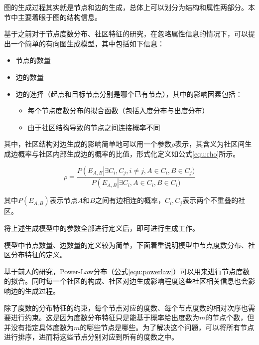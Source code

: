 图的生成过程其实就是节点和边的生成，总体上可以划分为结构和属性两部分。本节中主要着眼于图的结构信息。

基于之前对于节点度数分布、社区特征的研究，在忽略属性信息的情况下，可以提出一个简单的有向图生成模型，其中包括如下信息\cite{FastSGG}：

\begin{itemize}
    \item 节点的数量
    \item 边的数量
    \item 边的选择（起点和目标节点分别是哪个已有节点），其中的影响因素包括：
    \begin{itemize}
        \item 每个节点度数分布的拟合函数（包括入度分布与出度分布）
        \item 由于社区结构导致的节点之间连接概率不同
    \end{itemize}
\end{itemize}

\vspace{0.2cm}

其中，社区结构对边生成的影响简单地可以用一个参数$\rho$表示，其含义为社区间生成边概率与社区内部生成边的概率的比值，形式化定义如公式\ref{equ:rho}所示。

\vspace{-8mm}

\begin{equation}[H]
    \label{equ:rho}
    \rho = \frac{P\left(E_{A,B}\right|\exists C_i, C_j, i\ne j, A\in C_i, B\in C_j)}{P\left(E_{A,B}\right|\exists C_i, A\in C_i, B\in C_i)}
\end{equation}

\noindent 其中$P\left(E_{A,B}\right)$表示节点$A$和$B$之间有边相连的概率，$C_i, C_j$表示两个不重叠的社区。

将上述生成模型中的参数全部进行定义后，即可进行生成工作。

模型中节点数量、边数量的定义较为简单，下面着重说明模型中节点度数分布、社区分布特征的定义。

基于前人的研究，Power-Law分布（公式\ref{equ:powerlaw}）可以用来进行节点度数的拟合。同时每一个社区的构成、社区对边生成影响程度这些社区相关信息也会影响边的生成过程。

除了度数的分布特征的约束，每个节点对应的度数、每个节点度数的相对次序也需要进行约束。这是因为度数分布特征只是能基于概率给出度数为$m$的节点个数，但并没有指定具体度数为$m$的哪些节点是哪些。为了解决这个问题，可以将所有节点进行排序，进而将这些节点分别对应到所有的度数之中。


